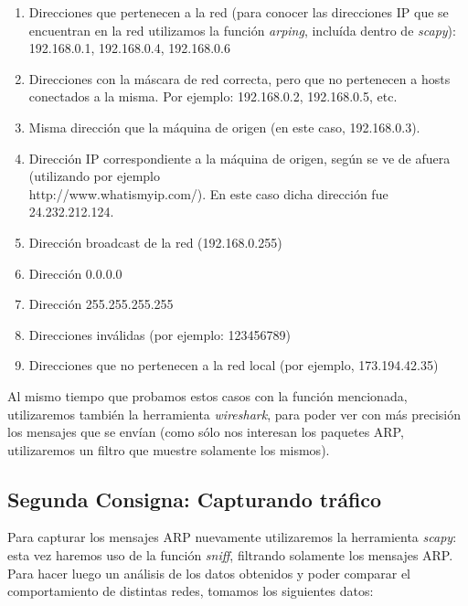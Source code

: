 \begin{enumerate}
 \item Direcciones que pertenecen a la red (para conocer las direcciones IP que se encuentran en la red utilizamos la funci\'on \emph{arping}, inclu\'ida dentro de \emph{scapy}): 192.168.0.1, 192.168.0.4, 192.168.0.6
 \item Direcciones con la m\'ascara de red correcta, pero que no pertenecen a hosts conectados a la misma. Por ejemplo: 192.168.0.2, 192.168.0.5, etc.
 \item Misma direcci\'on que la m\'aquina de origen (en este caso, 192.168.0.3).
 \item Direcci\'on IP correspondiente a la m\'aquina de origen, seg\'un se ve de afuera (utilizando por ejemplo \\ http://www.whatismyip.com/). En este caso dicha direcci\'on fue 24.232.212.124.
 \item Direcci\'on broadcast de la red (192.168.0.255)
 \item Direcci\'on 0.0.0.0
 \item Direcci\'on 255.255.255.255
 \item Direcciones inv\'alidas (por ejemplo: 123456789)
 \item Direcciones que no pertenecen a la red local (por ejemplo, 173.194.42.35)
\end{enumerate}

Al mismo tiempo que probamos estos casos con la funci\'on mencionada, utilizaremos tambi\'en la herramienta \emph{wireshark}, para poder ver con m\'as precisi\'on los mensajes que se env\'ian (como s\'olo nos interesan los paquetes ARP, utilizaremos un filtro que muestre solamente los mismos).

\subsection{Segunda Consigna: Capturando tr\'afico}

Para capturar los mensajes ARP nuevamente utilizaremos la herramienta \emph{scapy}: esta vez haremos uso de la funci\'on \emph{sniff}, filtrando solamente los mensajes ARP. Para hacer luego un an\'alisis de los datos obtenidos y poder comparar el comportamiento de distintas redes, tomamos los siguientes datos:

